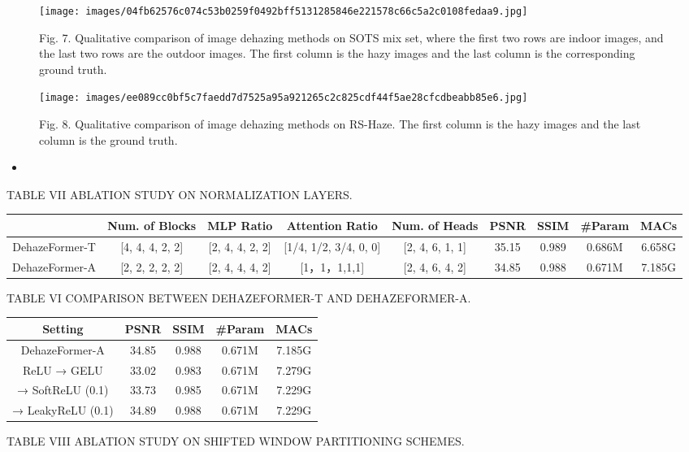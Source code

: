\documentclass{article}
\begin{document}
\begin{figure}[htbp]
\centering
\texttt{[image: images/04fb62576c074c53b0259f0492bff5131285846e221578c66c5a2c0108fedaa9.jpg]}
\caption{Fig. 7. Qualitative comparison of image dehazing methods on SOTS mix set, where the first two rows are indoor images, and the last two rows are the outdoor images. The first column is the hazy images and the last column is the corresponding ground truth.}
\end{figure}


\begin{figure}[htbp]
\centering
\texttt{[image: images/ee089cc0bf5c7faedd7d7525a95a921265c2c825cdf44f5ae28cfcdbeabb85e6.jpg]}
\caption{Fig. 8. Qualitative comparison of image dehazing methods on RS-Haze. The first column is the hazy images and the last column is the ground truth.}
\end{figure}


\begin{itemize}
\item %

\end{itemize}

TABLE VII ABLATION STUDY ON NORMALIZATION LAYERS.


\begin{tabular}{|c|c|c|c|c|c|c|c|c|}\hline
 & Num. of Blocks & MLP Ratio & Attention Ratio & Num. of Heads & PSNR & SSIM & #Param & MACs \\ \hline
DehazeFormer-T & [4, 4, 4, 2, 2] & [2, 4, 4, 2, 2] & [1/4, 1/2, 3/4, 0, 0] & [2, 4, 6, 1, 1] & 35.15 & 0.989 & 0.686M & 6.658G \\ \hline
DehazeFormer-A & [2, 2, 2, 2, 2] & [2, 4, 4, 4, 2] & [1，1，1,1,1] & [2, 4, 6, 4, 2] & 34.85 & 0.988 & 0.671M & 7.185G \\ \hline
\end{tabular}
TABLE VI COMPARISON BETWEEN DEHAZEFORMER-T AND DEHAZEFORMER-A.


\begin{tabular}{|c|c|c|c|c|}\hline
Setting & PSNR & SSIM & #Param & MACs \\ \hline
DehazeFormer-A & 34.85 & 0.988 & 0.671M & 7.185G \\ \hline
ReLU → GELU & 33.02 & 0.983 & 0.671M & 7.279G \\ \hline
→ SoftReLU (0.1) & 33.73 & 0.985 & 0.671M & 7.229G \\ \hline
→ LeakyReLU (0.1) & 34.89 & 0.988 & 0.671M & 7.229G \\ \hline
\end{tabular}
TABLE VIII ABLATION STUDY ON SHIFTED WINDOW PARTITIONING SCHEMES.
\end{document}

